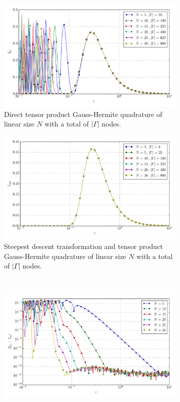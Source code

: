 \documentclass[a4paper,10pt]{article}
\begin{document}
\begin{figure}[ht!]
  \begin{subfigure}[t]{0.5\linewidth}
    \includegraphics[width=\linewidth]{./plots/tp_2d_conv_eps_(0,1)_(1,0)_val_qr.pdf}
    \caption{Direct tensor product Gauss-Hermite quadrature of linear size $N$ with a total of $|\Gamma|$ nodes.}
    \label{fig:tp_2d_conv_eps_01_10_val_qr}
  \end{subfigure}
  \begin{subfigure}[t]{0.5\linewidth}
    \includegraphics[width=\linewidth]{./plots/tp_2d_conv_eps_(0,1)_(1,0)_val_nsd.pdf}
    \caption{Steepest descent transformation and tensor product Gauss-Hermite quadrature of linear size $N$ with a total of $|\Gamma|$ nodes.}
    \label{fig:tp_2d_conv_eps_01_10_val_nsd}
  \end{subfigure} \\
  \begin{subfigure}[t]{0.5\linewidth}
    \includegraphics[width=\linewidth]{./plots/tp_2d_conv_eps_(0,1)_(1,0)_err_qr.pdf}

\end{subfigure}
\end{figure}
\end{document}
